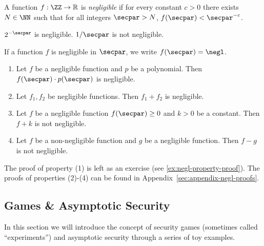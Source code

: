 \begin{definition}
A function $f: \ZZ \rightarrow \mathbb{R}$ is \emph{negligible} if for every constant $c > 0$ there exists $N \in \NN$ such that for all integers $\secpar > N$, $f(\secpar) < \secpar^{-c}$.
\end{definition}

\begin{example}
  $2^{-\secpar}$ is negligible. $1/\secpar$ is not negligible.
\end{example}

If a function $f$ is negligible in $\secpar$, we write $f(\secpar) = \negl$.


\begin{lemma}
  \label{lem:negl}
  \hfill
  \begin{enumerate}
  \item Let $f$ be a negligible function and $p$ be a polynomial. Then $f(\secpar) \cdot p(\secpar)$ is negligible.
  \item Let $f_1, f_2$ be negligible functions. Then $f_1 + f_2$ is negligible.
  \item Let $f$ be a negligible function $f(\secpar) \ge 0$ and $k > 0$ be a constant. Then $f + k$ is not negligible.
  \item Let $f$ be a non-negligible function and $g$ be a negligible function. Then $f - g$ is not negligible.
  \end{enumerate}
\end{lemma}

The proof of property (1) is left as an exercise (see \autoref{ex:negl-property-proof}).
The proofs of properties (2)-(4) can be found in Appendix~\ref{sec:appendix-negl-proofs}.

\subsection{Games \& Asymptotic Security}

In this section we will introduce the concept of security games (sometimes called ``experiments'') and asymptotic security through a series of toy examples.


